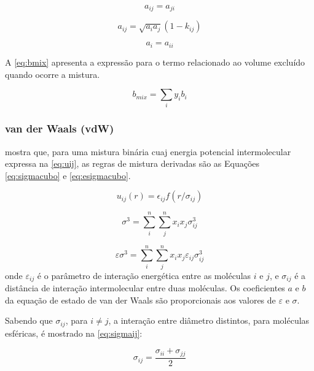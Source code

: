 \begin{equation}\label{eq:aij2}
a_{ij} = a_{ji}
\end{equation}

\begin{equation}\label{eq:aij3}
a_{ij} = \sqrt{a_ia_j}(1 - k_{ij})
\end{equation}

\begin{equation}\label{eq:aij4}
a_{i} = a_{ii}
\end{equation}

A \autoref{eq:bmix} apresenta a expressão para o termo relacionado ao volume
excluído quando ocorre a mistura.

\begin{equation}\label{eq:bmix}
b_{mix} = \sum_iy_ib_i
\end{equation}

\subsubsection{van der Waals (vdW)}
 mostra que, para uma mistura binária cuaj energia potencial
intermolecular expressa na \autoref{eq:uij}, as regras de mistura derivadas são 
as Equações \ref{eq:sigmacubo} e \ref{eq:esigmacubo}.

\begin{equation}\label{eq:uij}
u_{ij}(r) = \epsilon_{ij}f(r/\sigma_{ij})
\end{equation}

\begin{equation}\label{eq:sigmacubo}
\sigma^3 = \sum_i^n\sum_j^nx_ix_j\sigma_{ij}^3
\end{equation}

\begin{equation}\label{eq:esigmacubo}
\varepsilon\sigma^3 = \sum_i^n\sum_j^nx_ix_j\varepsilon_{ij}\sigma_{ij}^3
\end{equation}
onde $\varepsilon_{ij}$ é o parâmetro de interação energética entre as moléculas
$i$ e $j$, e $\sigma_{ij}$ é a distância de interação intermolecular entre duas
moléculas. Os coeficientes $a$ e $b$ da equação de estado de van der Waals são
proporcionais aos valores de $\varepsilon$ e $\sigma$.

Sabendo que $\sigma_{ij}$, para $i \neq j$, a interação entre diâmetro
distintos, para moléculas esféricas, é mostrado na \autoref{eq:sigmaij}:

\begin{equation}\label{eq:sigmaij}
\sigma_{ij} = \frac{\sigma_{ii} + \sigma_{jj}}{2}
\end{equation}

